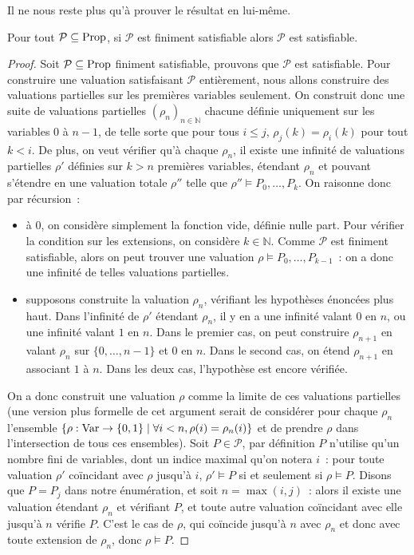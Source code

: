 Il ne nous reste plus qu'à prouver le résultat en lui-même.

\begin{theorem}\label{thm.compac.prop}
  Pour tout $\mathcal P\subseteq\operatorname{Prop}$, si $\mathcal P$ est finiment satisfiable
  alors $\mathcal P$ est satisfiable.
\end{theorem}

\begin{proof}
  Soit $\mathcal P\subseteq\operatorname{Prop}$ finiment satisfiable, prouvons que
  $\mathcal P$ est satisfiable. Pour construire une valuation satisfaisant
  $\mathcal P$ entièrement, nous allons construire des valuations partielles
  sur les premières variables seulement. On construit donc une suite de
  valuations partielles $(\rho_n)_{n\in\mathbb N}$ chacune définie uniquement
  sur les variables $0$ à $n-1$, de telle sorte que pour tous $i\leq j$,
  $\rho_j(k) = \rho_i(k)$ pour tout $k < i$. De plus, on veut vérifier qu'à
  chaque $\rho_n$, il existe une infinité de valuations partielles
  $\rho'$ définies sur $k > n$ premières variables, étendant $\rho_n$ et
  pouvant s'étendre en une valuation totale $\rho''$ telle que
  $\rho''\models P_0,\ldots,P_k$. On raisonne donc par récursion~:
  \begin{itemize}
  \item à $0$, on considère simplement la fonction vide, définie nulle part.
    Pour vérifier la condition sur les extensions, on considère $k\in\mathbb N$.
    Comme $\mathcal P$ est finiment satisfiable, alors on peut trouver une
    valuation $\rho\models P_0,\ldots,P_{k-1}$~: on a donc une infinité de
    telles valuations partielles.
  \item supposons construite la valuation $\rho_n$, vérifiant les hypothèses
    énoncées plus haut. Dans l'infinité de $\rho'$ étendant $\rho_n$, il y en a
    une infinité valant $0$ en $n$, ou une infinité valant $1$ en $n$. Dans le
    premier cas, on peut construire $\rho_{n+1}$ en valant $\rho_n$ sur
    $\{0,\ldots,n-1\}$ et $0$ en $n$. Dans le second cas, on étend $\rho_{n+1}$
    en associant $1$ à $n$. Dans les deux cas, l'hypothèse est encore vérifiée.
  \end{itemize}
  On a donc construit une valuation $\rho$ comme la limite de ces valuations
  partielles (une version plus formelle de cet argument serait de considérer
  pour chaque $\rho_n$ l'ensemble
  $\{\rho : \operatorname{Var} \to \{0,1\}\mid \forall i < n, \rho(i) = \rho_n(i)\}$ et de
  prendre $\rho$ dans l'intersection de tous ces ensembles). Soit
  $P\in\mathcal P$, par définition $P$ n'utilise qu'un nombre fini de variables,
  dont un indice maximal qu'on notera $i$~: pour toute valuation $\rho'$
  coïncidant avec $\rho$ jusqu'à $i$, $\rho'\models P$ si et seulement si
  $\rho\models P$. Disons que $P = P_j$ dans notre énumération, et soit
  $n = \max(i,j)$~: alors il existe une valuation étendant $\rho_n$ et
  vérifiant $P$, et toute autre valuation coïncidant avec elle jusqu'à $n$
  vérifie $P$. C'est le cas de $\rho$, qui coïncide jusqu'à $n$ avec $\rho_n$ et
  donc avec toute extension de $\rho_n$, donc $\rho\models P$.


\end{proof}
